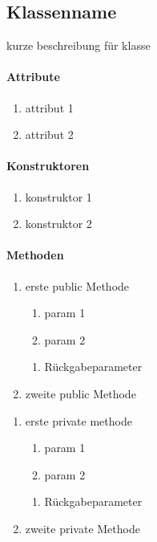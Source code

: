 \subsection{Klassenname}
kurze beschreibung für klasse

\paragraph{Attribute}
\begin{enumerate}[$\bullet$]
\item attribut 1
\item attribut 2
\end{enumerate}

\paragraph{Konstruktoren}
\begin{enumerate}[+]
\item konstruktor 1
\item konstruktor 2
\end{enumerate}

\paragraph{Methoden}

\begin{enumerate}[+]
\item erste public Methode

\begin{enumerate}[$\bullet$]
\item param 1
\item param 2
\end{enumerate}
\vspace{-0.2cm}
\begin{enumerate}[$\circ$]
\item Rückgabeparameter
\end{enumerate}

\item zweite public Methode
\end{enumerate}

\begin{enumerate}[$-$]
\item erste private methode

\begin{enumerate}[$\bullet$]
\item param 1
\item param 2
\end{enumerate}
\vspace{-0.2cm}
\begin{enumerate}[$\circ$]
\item Rückgabeparameter
\end{enumerate}

\item zweite private Methode
\end{enumerate}
